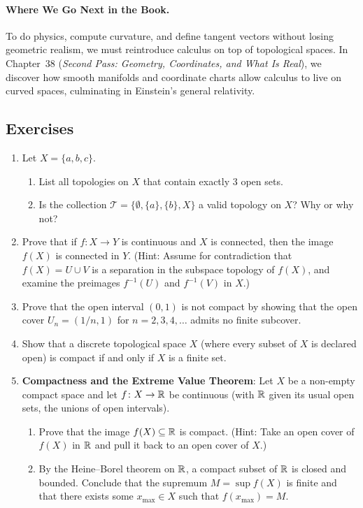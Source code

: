 \paragraph{Where We Go Next in the Book.}
To do physics, compute curvature, and define tangent vectors without losing geometric realism, we must reintroduce calculus on top of topological spaces. In Chapter~38 (\emph{Second Pass: Geometry, Coordinates, and What Is Real}), we discover how smooth manifolds and coordinate charts allow calculus to live on curved spaces, culminating in Einstein's general relativity.

\subsection{Exercises}

\begin{enumerate}
  \item Let $X = \{a, b, c\}$.
  \begin{enumerate}
    \item List all topologies on $X$ that contain exactly 3 open sets.
    \item Is the collection $\mathcal{T} = \{\emptyset, \{a\}, \{b\}, X\}$ a valid topology on $X$? Why or why not?
  \end{enumerate}
  \item Prove that if $f\colon X \to Y$ is continuous and $X$ is connected, then the image $f(X)$ is connected in $Y$. (Hint: Assume for contradiction that $f(X) = U \cup V$ is a separation in the subspace topology of $f(X)$, and examine the preimages $f^{-1}(U)$ and $f^{-1}(V)$ in $X$.)
  \item Prove that the open interval $(0, 1)$ is not compact by showing that the open cover $U_n = (1/n, 1)$ for $n = 2, 3, 4, \dots$ admits no finite subcover.
  \item Show that a discrete topological space $X$ (where every subset of $X$ is declared open) is compact if and only if $X$ is a finite set.
  \item \textbf{Compactness and the Extreme Value Theorem}: Let $X$ be a non-empty compact space and let $f\colon X \to \mathbb{R}$ be continuous (with $\mathbb{R}$ given its usual open sets, the unions of open intervals).
  \begin{enumerate}
    \item Prove that the image $f(X) \subseteq \mathbb{R}$ is compact. (Hint: Take an open cover of $f(X)$ in $\mathbb{R}$ and pull it back to an open cover of $X$.)
    \item By the Heine--Borel theorem on $\mathbb{R}$, a compact subset of $\mathbb{R}$ is closed and bounded. Conclude that the supremum $M = \sup f(X)$ is finite and that there exists some $x_{\max} \in X$ such that $f(x_{\max}) = M$.
  \end{enumerate}
\end{enumerate}

\newpage
